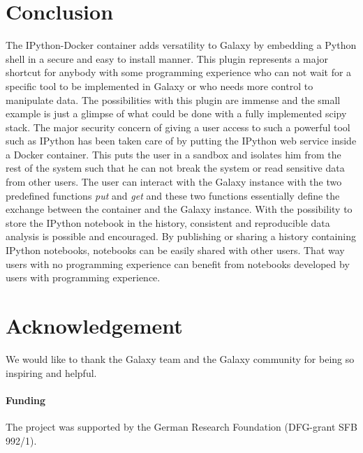 \documentclass{bioinfo}
\begin{document}
\section{Conclusion}
The IPython-Docker container adds versatility to Galaxy by embedding a Python shell in a secure and easy to install manner. This plugin represents a major shortcut for anybody with some programming experience who can not wait for a specific tool to be implemented in Galaxy or who needs more control to manipulate data. The possibilities with this plugin are immense and the small example is just a glimpse of what could be done with a fully implemented scipy stack. The major security concern of giving a user access to such a powerful tool such as IPython has been taken care of by putting the IPython web service inside a Docker container. This puts the user in a sandbox and isolates him from the rest of the system such that he can not break the system or read sensitive data from other users. The user can interact with the Galaxy instance with the two predefined functions \textit{put} and \textit{get} and these two functions essentially define the exchange between the container and the Galaxy instance. With the possibility to store the IPython notebook in the history, consistent and reproducible data analysis is possible and encouraged. By publishing or sharing a history containing IPython notebooks, notebooks can be easily shared with other users. That way users with no programming experience can benefit from notebooks developed by users with programming experience. 



\section*{Acknowledgement}
We would like to thank the Galaxy team and the Galaxy community for being so inspiring and helpful. 


\paragraph{Funding\textcolon} The project was supported by the German Research Foundation (DFG-grant SFB 992/1).


%
%
%
%
%
%
%
%
\end{document}
